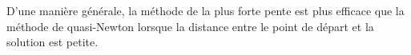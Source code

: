 \documentclass[11pt,a4paper,twoside,onecolumn,titlepage]{report}
\begin{document}
\begin{enumerate}[(a)]
D'une manière générale, la méthode de la plus forte pente est plus efficace que la méthode de quasi-Newton lorsque la distance entre le point de départ et la solution est petite.
\end{enumerate}
\end{document}
